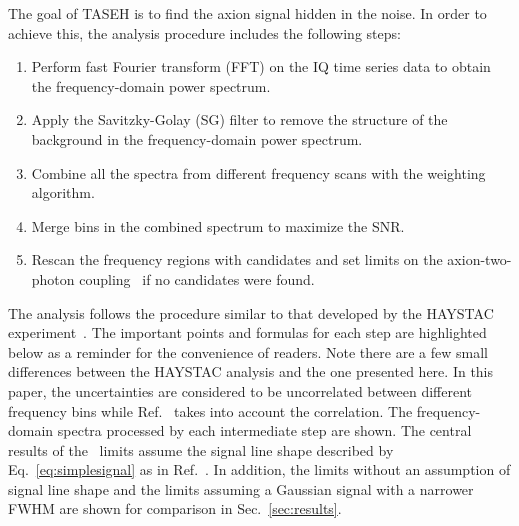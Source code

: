 The goal of TASEH is to find the axion signal hidden in the noise. In 
order to achieve this, the analysis procedure includes the following steps:
    \begin{enumerate}
        \item Perform fast Fourier transform (FFT) on the 
IQ time series data to obtain the frequency-domain power spectrum.
        \item Apply the Savitzky-Golay (SG) filter to remove the structure 
of the background in the frequency-domain power spectrum.
        \item Combine all the spectra from different frequency scans with 
the weighting algorithm.
        \item Merge bins in the combined spectrum to maximize the SNR. 
       \item Rescan the frequency regions with candidates and set limits on 
      the axion-two-photon coupling \gagg\ if no candidates were found.
    \end{enumerate}

    The analysis follows the procedure similar to that 
developed by the HAYSTAC experiment~\cite{HAYSTACII}. The important points  
and formulas for each step are highlighted below as a reminder 
for the convenience of readers. Note there are a few  
small differences between the HAYSTAC analysis and the one presented here. 
In this paper, the uncertainties are considered to be uncorrelated between 
different frequency bins while Ref.~\cite{HAYSTACII} takes into account 
the correlation. The frequency-domain spectra processed by each intermediate 
step are shown. The central results of the \gagg\ limits assume the signal 
line shape described by Eq.~\eqref{eq:simplesignal} as in 
Ref.~\cite{HAYSTACII}. In addition, the limits without an assumption of 
signal line shape and the limits assuming a 
Gaussian signal with a narrower FWHM are 
shown for comparison in Sec.~\ref{sec:results}.

